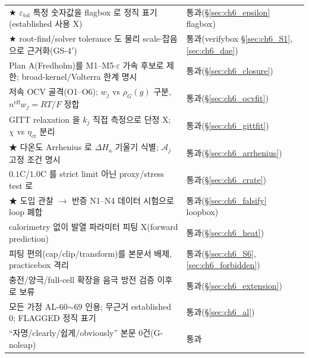 \documentclass[11pt,a4paper]{article}
\newcommand{\eff}{\mathrm{eff}}
\newcommand{\ct}{\mathrm{ct}}
\newcommand{\tol}{\mathrm{tol}}
\begin{document}
{\begin{longtable}{p{} p{}}
★ $\varepsilon_\tol$ 특정 숫자값을 flagbox 로 정직 표기(established 사용 X) & 통과(\S\ref{sec:ch6_epsilon} flagbox) \\
★ root-find/solver tolerance 도 물리 scale$\cdot$잡음으로 근거화(GS-4$'$) & 통과(verifybox \S\ref{sec:ch6_S1},\ref{sec:ch6_dae}) \\
Plan A(Fredholm)를 M1--M5$\cdot\varepsilon$ 가속 후보로 제한; broad-kernel/Volterra 한계 명시 & 통과(\S\ref{sec:ch6_closure}) \\
저속 OCV 골격(O1--O6); $w_j$ vs $\rho_G(g)$ 구분, $n^{\eff}w_j=RT/F$ 정합 & 통과(\S\ref{sec:ch6_ocvfit}) \\
GITT relaxation 을 $k_j$ 직접 측정으로 단정 X; $\chi$ vs $\eta_\ct$ 분리 & 통과(\S\ref{sec:ch6_gittfit}) \\
★ 다온도 Arrhenius 로 $\Delta H_a$ 기울기 식별; $\mathcal A_j$ 고정 조건 명시 & 통과(\S\ref{sec:ch6_arrhenius}) \\
$0.1\mathrm C/1.0\mathrm C$ 를 strict limit 아닌 proxy/stress test 로 & 통과(\S\ref{sec:ch6_crate}) \\
★ 도입 관찰 $\to$ 반증 N1--N4 데이터 시험으로 loop 폐합 & 통과(\S\ref{sec:ch6_falsify} loopbox) \\
calorimetry 없이 발열 파라미터 피팅 X(forward prediction) & 통과(\S\ref{sec:ch6_heat}) \\
피팅 편의(cap/clip/transform)를 본문서 배제, practicebox 격리 & 통과(\S\ref{sec:ch6_S6},\ref{sec:ch6_forbidden}) \\
충전/양극/full-cell 확장을 음극 방전 검증 이후로 보류 & 통과(\S\ref{sec:ch6_extension}) \\
모든 가정 AL-60$\sim$69 인용; 무근거 established 0; FLAGGED 정직 표기 & 통과(\S\ref{sec:ch6_al}) \\
``자명/clearly/쉽게/obviously'' 본문 0건(G-noleap) & 통과 \\
\bottomrule
\end{longtable}
}

\end{document}
